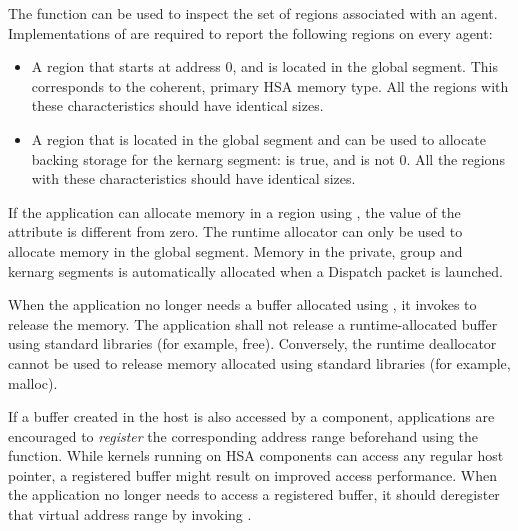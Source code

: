\documentclass[final]{book}
\begin{document}
The function  can be used to inspect the set
of regions associated with an agent. Implementations of
 are required to report the following
regions on every agent:
\begin{itemize}[itemsep=1pt,topsep=3pt,partopsep=0pt]
\item A region that starts at address 0, and is located in the global
  segment. This corresponds to the coherent, primary HSA memory type. All the
  regions with these characteristics should have identical sizes.
\item A region that is located in the global segment and can be used to allocate
  backing storage for the kernarg segment:  is
  true, and  is not 0. All the regions
  with these characteristics should have identical sizes.
\end{itemize}

If the application can allocate memory in a region using
, the value of the attribute
 is different from zero. The runtime
allocator can only be used to allocate memory in the global segment. Memory in
the private, group and kernarg segments is automatically allocated when a
Dispatch packet is launched.

When the application no longer needs a buffer allocated using
, it invokes  to release the
memory. The application shall not release a runtime-allocated buffer using
standard libraries (for example, free). Conversely, the runtime deallocator
cannot be used to release memory allocated using standard libraries (for
example, malloc).

If a buffer created in the host is also accessed by a component, applications
are encouraged to \emph{register} the corresponding address range beforehand
using the  function. While kernels running on HSA
components can access any regular host pointer, a registered buffer might
result on improved access performance.  When the application no longer needs to
access a registered buffer, it should deregister that virtual address range by
invoking .
\end{document}
